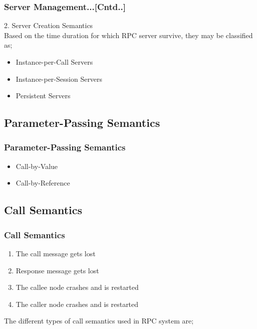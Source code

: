 \documentclass{beamer}
\begin{document}
\begin{frame}
	\frametitle{Server Management...[Cntd..]}
	\vspace{0.3cm}
	2. Server Creation Semantics\\
	\vspace{0.3cm}
	Based on the time duration for which RPC server survive, they may be classified as;
	\vspace{0.3cm}
	\begin{itemize}
		\item Instance-per-Call Servers
		\item Instance-per-Session Servers
		\item Persistent Servers
	\end{itemize}
		
	\vspace{5cm}
\end{frame}

\subsection{Parameter-Passing Semantics}
\begin{frame}
	\frametitle{Parameter-Passing Semantics}
	\vspace{0.3cm}
	\vspace{0.3cm}
	\begin{itemize}
		\item Call-by-Value
		\item Call-by-Reference
	\end{itemize}
		
	\vspace{5cm}
\end{frame}


\subsection{Call Semantics}
\begin{frame}
	\frametitle{Call Semantics}
	\vspace{0.3cm}
	\vspace{0.3cm}
	\begin{enumerate}
		\item The call message gets lost
		\item Response message gets lost
		\item The callee node crashes and is restarted
		\item The caller node crashes and is restarted
	\end{enumerate}		
	The different types of call semantics used in RPC system are;
	\vspace{5cm}
\end{frame}
\end{document}
